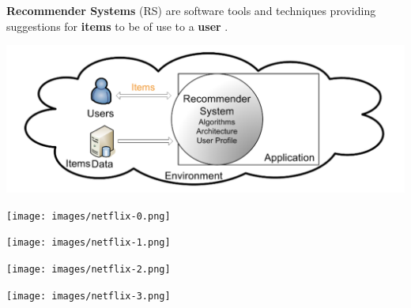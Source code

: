 \documentclass[11pt,aspectratio=169,handout]{beamer}
\begin{document}
\begin{frame}{}

\vfill
\begin{tcolorbox}[colback=info!5,colframe=info!80,title=]
{\bf Recommender Systems} (RS) are software tools and techniques providing suggestions for {\bf items} to be of use to a {\bf user} \cite{RSHB}.
\end{tcolorbox}
\vfill
\begin{center}
\includegraphics[scale=0.3]{images/overall.png}
\end{center}

\end{frame}

\begin{frame}{}

\begin{center}
\texttt{[image: images/netflix-0.png]}
\end{center}

\end{frame}

\begin{frame}{}

\begin{center}
\texttt{[image: images/netflix-1.png]}
\end{center}

\end{frame}

\begin{frame}{}

\begin{center}
\texttt{[image: images/netflix-2.png]}
\end{center}

\end{frame}

\begin{frame}{}

\begin{center}
\texttt{[image: images/netflix-3.png]}
\end{center}

\end{frame}
\end{document}
